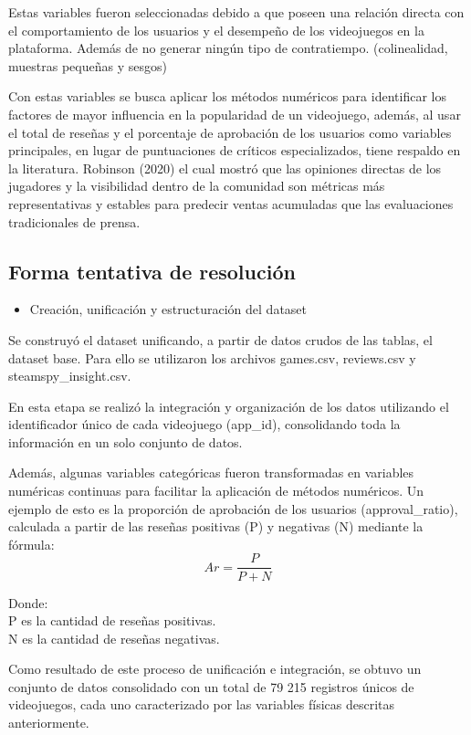 \documentclass[12pt]{report}
\begin{document}
Estas variables fueron seleccionadas debido a que poseen una relación directa con el comportamiento de los usuarios y el desempeño de los videojuegos en la plataforma.
Además de no generar ningún tipo de contratiempo. (colinealidad, muestras pequeñas y sesgos)

Con estas variables se busca aplicar los métodos numéricos para identificar los factores de mayor influencia en la popularidad de un videojuego, además, al usar el total de reseñas y el porcentaje de aprobación de los usuarios como variables principales, en lugar de puntuaciones de críticos especializados, tiene respaldo en la literatura. Robinson (2020)\cite{robinson2020predicting} el cual mostró que las opiniones directas de los jugadores y la visibilidad dentro de la comunidad son métricas más representativas y estables para predecir ventas acumuladas que las evaluaciones tradicionales de prensa.

\subsection*{Forma tentativa de resolución}
\begin{itemize}
    \item Creación, unificación y estructuración del dataset
\end{itemize}
Se construyó el dataset unificando, a partir de datos crudos de las tablas, el dataset base. Para ello se utilizaron los archivos games.csv, reviews.csv y steamspy\_insight.csv.

En esta etapa se realizó la integración y organización de los datos utilizando el identificador único de cada videojuego (app\_id), consolidando toda la información en un solo conjunto de datos.

Además, algunas variables categóricas fueron transformadas en variables numéricas continuas para facilitar la aplicación de métodos numéricos.
Un ejemplo de esto es la proporción de aprobación de los usuarios (approval\_ratio), calculada a partir de las reseñas positivas (P) y negativas (N) mediante la fórmula:
$$ Ar = \frac{P}{P + N} $$

Donde:\\
P es la cantidad de reseñas positivas.\\
N es la cantidad de reseñas negativas.

Como resultado de este proceso de unificación e integración, se obtuvo un conjunto de datos consolidado con un total de 79 215 registros únicos de videojuegos, cada uno caracterizado por las variables físicas descritas anteriormente.
\end{document}
